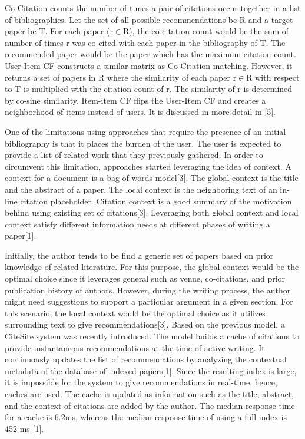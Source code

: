 \documentclass[journal]{IEEEtran}
\begin{document}
Co-Citation counts the number of times a pair of citations occur together in a list of bibliographies. Let the set of all possible recommendations be R and a target paper be T.  For each paper (r$\in$R), the co-citation count would be the sum of number of times r was co-cited with each paper in the bibliography of T.   The recommended paper would be the paper which has the maximum citation count.  User-Item CF constructs a similar matrix as Co-Citation matching.  However, it returns a set of papers in R where the similarity of each paper r$\in$R with respect to T is multiplied with the citation count of r.  The similarity of r is determined by co-sine similarity.  Item-item CF flips the User-Item CF and creates a neighborhood of items instead of users.   It is discussed in more detail in [5].  

One of the limitations using approaches that require the presence of an initial bibliography is that it places the burden of the user.  The user is expected to provide a list of related work that they previously gathered. In order to circumvent this limitation, approaches started leveraging the idea of context. A context for a document is a bag of words model[3].  The global context is the title and the abstract of a paper.  The local context is the neighboring text of an in-line citation placeholder.   Citation context is a good summary of the motivation behind using existing set of citations[3].  Leveraging both global context and local context satisfy different information needs at different phases of writing a paper[1].  

Initially, the author tends to be find a generic set of papers based on prior knowledge of related literature.  For this purpose, the global context would be the optimal choice since it leverages general such as venue, co-citations, and prior publication history of authors. However, during the writing process, the author might need suggestions to support a particular argument in a given section.  For this scenario, the local context would be the optimal choice as it utilizes surrounding text to give recommendations[3].  
Based on the previous model, a CiteSite system was recently introduced.  The model builds a cache of citations to provide instantaneous recommendations at the time of active writing.  It continuously updates the list of recommendations by analyzing the contextual metadata of the database of indexed papers[1].  Since the resulting index is large, it is impossible for the system to give recommendations in real-time, hence, caches are used.  The cache is updated as information such as the title, abstract, and the context of citations are added by the author.  The median response time for a cache is 6.2ms, whereas the median response time of using a full index is 452 ms [1].   
\end{document}

